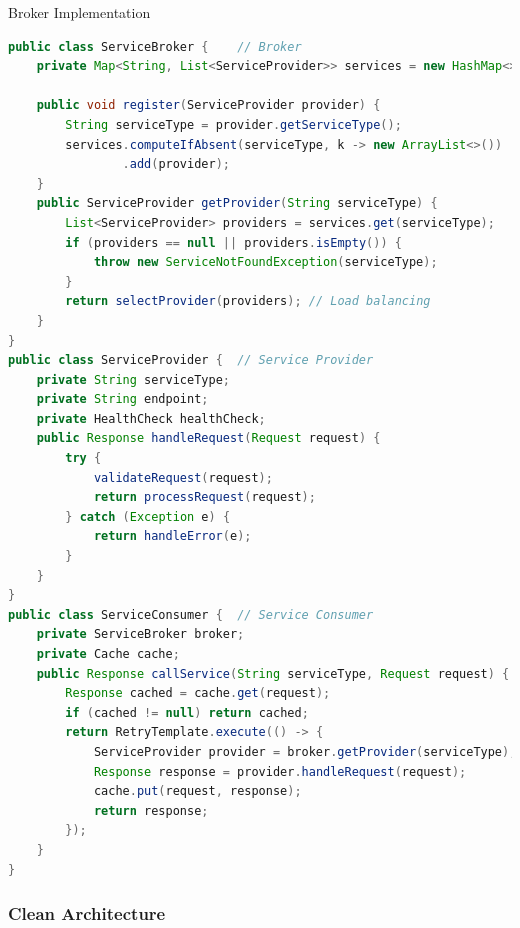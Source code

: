 \begin{example2}{Broker Implementation}
\begin{lstlisting}[language=Java, style=basesmol]
public class ServiceBroker {    // Broker
    private Map<String, List<ServiceProvider>> services = new HashMap<>();
    
    public void register(ServiceProvider provider) {
        String serviceType = provider.getServiceType();
        services.computeIfAbsent(serviceType, k -> new ArrayList<>())
                .add(provider);
    }
    public ServiceProvider getProvider(String serviceType) {
        List<ServiceProvider> providers = services.get(serviceType);
        if (providers == null || providers.isEmpty()) {
            throw new ServiceNotFoundException(serviceType);
        }
        return selectProvider(providers); // Load balancing
    }
}
public class ServiceProvider {  // Service Provider
    private String serviceType;
    private String endpoint;
    private HealthCheck healthCheck;
    public Response handleRequest(Request request) {
        try {
            validateRequest(request);
            return processRequest(request);
        } catch (Exception e) {
            return handleError(e);
        }
    }
}
public class ServiceConsumer {  // Service Consumer
    private ServiceBroker broker;
    private Cache cache;
    public Response callService(String serviceType, Request request) {
        Response cached = cache.get(request);
        if (cached != null) return cached;
        return RetryTemplate.execute(() -> {
            ServiceProvider provider = broker.getProvider(serviceType);
            Response response = provider.handleRequest(request);
            cache.put(request, response);
            return response;
        });
    }
}
\end{lstlisting}
\end{example2}


\subsubsection{Clean Architecture}

